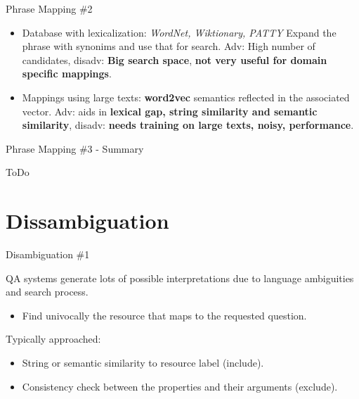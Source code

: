 \documentclass{beamer}
\begin{document}

\begin{frame}{Phrase Mapping \#2}
  \begin{card}
    \begin{itemize}
      \item Database with lexicalization: \textit{WordNet, Wiktionary, PATTY} Expand the phrase with synonims and use that for search. Adv: High number of candidates, disadv: \textbf{Big search space}, \textbf{not very useful for domain specific mappings}.
      \item Mappings using large texts: \textbf{word2vec} semantics reflected in the associated vector. Adv: aids in \textbf{lexical gap, string similarity and semantic similarity}, disadv: \textbf{needs training on large texts, noisy, performance}.
    \end{itemize}
  \end{card}
\end{frame}


\begin{frame}{Phrase Mapping \#3 - Summary}
  \begin{card}
    ToDo
  \end{card}
\end{frame}

\section{Dissambiguation}

\begin{frame}{Disambiguation \#1}
  \begin{card}
    QA systems generate lots of possible interpretations due to language ambiguities and search process.
    \begin{itemize}
      \item Find univocally the resource that maps to the requested question.
    \end{itemize}
  \end{card}
  \begin{card}
    Typically approached:
    \begin{itemize}
      \item String or semantic similarity to resource label (include).
      \item Consistency check between the properties and their arguments (exclude).
    \end{itemize}
  \end{card}
\end{frame}
\end{document}
